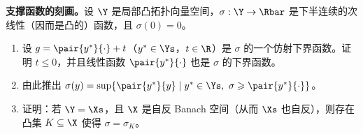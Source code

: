 \begin{exercise}[原讲义 B.2 练习 17]
\label{exo:B2-17}
\textbf{支撑函数的刻画。}设 $\Y$ 是局部凸拓扑向量空间，$\sigma:\Y\to\Rbar$ 是下半连续的次线性（因而是凸的）函数，且 $\sigma(0)=0$。
\begin{enumerate}[label=\arabic*.]
  \item 设 $g=\pair{y^*}{\cdot}+t$（$y^*\in\Ys$，$t\in\R$）是 $\sigma$ 的一个仿射下界函数。证明 $t\leqslant0$，并且线性函数 $\pair{y^*}{\cdot}$ 也是 $\sigma$ 的下界函数。
  \item 由此推出 $\sigma(y)=\sup\{\pair{y^*}{y} \mid y^*\in\Ys,\ \sigma\geqslant\pair{y^*}{\cdot}\}$。
  \item 证明：若 $\Y=\Xs$，且 $\X$ 是自反 Banach 空间（从而 $\Xs$ 也自反），则存在凸集 $K\subseteq\X$ 使得 $\sigma=\sigma_K$。
\end{enumerate}
\end{exercise}
